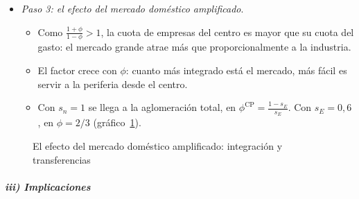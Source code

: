 \documentclass[11pt]{article}
\begin{document}
\begin{itemize}
\begin{itemize}
\begin{itemize}
    \end{itemize}
  \end{itemize}
\item \emph{Paso 3: el efecto del mercado doméstico amplificado}.
  \begin{itemize}
  \item Como $\frac{1+\phi}{1-\phi}>1$, la cuota de empresas del centro es mayor que su cuota del gasto: el mercado grande atrae más que proporcionalmente a la industria.
  \item El factor crece con $\phi$: cuanto más integrado está el mercado, más fácil es servir a la periferia desde el centro.
  \item Con $s_n=1$ se llega a la aglomeración total, en $\phi^{\mathrm{CP}}=\frac{1-s_E}{s_E}$. Con $s_E=0{,}6$, en $\phi=2/3$ (gráfico~\ref{fig:mercado-domestico}).
  \end{itemize}
\end{itemize}

\begin{figure}[H]
\centering
\caption{El efecto del mercado doméstico amplificado: integración y transferencias}\label{fig:mercado-domestico}
\end{figure}

\subparagraph{iii) Implicaciones}
\end{document}
